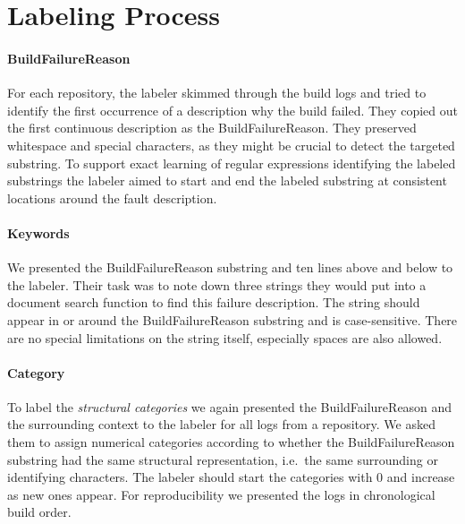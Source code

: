 \documentclass[\myrootdir/main.tex]{subfiles}
\begin{document}

\section{Labeling Process}
\label{sec:labeling-process}

\paragraph{BuildFailureReason}
For each repository, the labeler skimmed through the build logs and tried to identify the first occurrence of a description why the build failed.
They copied out the first continuous description as the BuildFailureReason.
They preserved whitespace and special characters, as they might be crucial to detect the targeted substring.
To support exact learning of regular expressions identifying the labeled substrings the labeler aimed to start and end the labeled substring at consistent locations around the fault description.

\paragraph{Keywords}
We presented the BuildFailureReason substring and ten lines above and below to the labeler.
Their task was to note down three strings they would put into a document search function to find this failure description.
The string should appear in or around the BuildFailureReason substring and is case-sensitive.
There are no special limitations on the string itself, especially spaces are also allowed.

\paragraph{Category}
To label the \emph{structural categories} we again presented the BuildFailureReason and the surrounding context to the labeler for all logs from a repository.
We asked them to assign numerical categories according to whether the BuildFailureReason substring had the same structural representation, i.e.\ the same surrounding or identifying characters.
The labeler should start the categories with 0 and increase as new ones appear.
For reproducibility we presented the logs in chronological build order.
\end{document}
